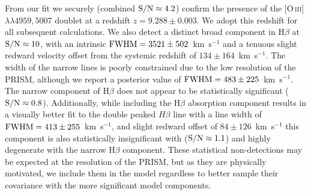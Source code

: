 \documentclass[twocolumn]{aastex7}
\newcommand{\oiii}{[O\,\textsc{iii}]}
\begin{document}
From our fit we securely (combined ${\rm S/N}\approx4.2$) confirm the presence of the \oiii$\lambda\lambda4959,5007$ doublet at a redshift $z=9.288\pm0.003$. We adopt this redshift for all subsequent calculations. We also detect a distinct broad component in H$\beta$ at ${\rm S/N}\approx10$, with an intrinsic ${\rm FWHM}=3521\pm502$~km~s$^{-1}$ and a tenuous slight redward velocity offset from the systemic redshift of $134\pm164$~km~s$^{-1}$. The width of the narrow lines is poorly constrained due to the low resolution of the PRISM, although we report a posterior value of ${\rm FWHM}=483\pm225$~km~s$^{-1}$. The narrow component of H$\beta$ does not appear to be statistically significant (${\rm S/N}\approx0.8$). Additionally, while including the H$\beta$ absorption component results in a visually better fit to the double peaked $H\beta$ line with a line width of ${\rm FWHM}=413\pm255$~km~s$^{-1}$, and slight redward offset of $84\pm126$~km~s$^{-1}$ this component is also statistically insignificant with (${\rm S/N}\approx1.1$) and highly degenerate with the narrow H$\beta$ component. These statistical non-detections may be expected at the resolution of the PRISM, but as they are physically motivated, we include them in the model regardless to better sample their covariance with the more significant model components. 
\end{document}
